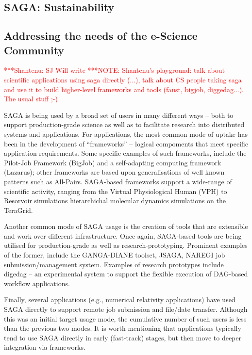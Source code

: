 \documentclass[a4paper,10pt]{article}
\newcommand{\note}[1]{ {\textcolor{red} { ***NOTE: #1 }}}
\newcommand{\jhanote}[1]{  {\textcolor{red}     { ***Shantenu: #1 }}}
\newcommand{\jhanote}[1]{}
\begin{document}
\subsection*{SAGA: Sustainability}
\vspace{-0.5em}
\subsection*{Addressing the needs of the e-Science Community}
\jhanote{SJ Will write} \note{Shantenu's playground: talk about
  scientific applications using saga directly (...), talk about CS
  people taking saga and use it to build higher-level frameworks and
  tools (faust, bigjob, diggedag...). The usual stuff ;-)}

SAGA is being used by a broad set of users in many different ways --
both to support production-grade science as well as to facilitate
research into distributed systems and applications.  For applications,
the most common mode of uptake has been in the development of
``frameworks'' -- logical compoments that meet specific application
requirements. Some specific examples of such frameworks, include the
Pilot-Job Framework (BigJob) and a self-adapting computing framework
(Lazarus); other frameworks are based upon generalisations of well
known patterns such as All-Pairs. SAGA-based frameworks support a
wide-range of scientific activity, ranging from the Virtual
Physiological Human (VPH) to Resorvoir simulations hierarchichal
molecular dynamics simulations on the TeraGrid.

Another common mode of SAGA usage is the creation of tools that are
extensible and work over different infrastructure. Once again,
SAGA-based tools are being utilised for production-grade as well as
research-prototyping. Prominent examples of the former, include the
GANGA-DIANE toolset, JSAGA, NAREGI job submission/management
system. Examples of research prototypes include digedag -- an
experimental system to support the flexible execution of DAG-based
workflow applications.

Finally, several applications (e.g., numerical relativity
applications) have used SAGA directly to support remote job submission
and file/date transfer. Although this was an initial target usage
mode, the cumulative number of such users is less than the previous
two modes. It is worth mentioning that applications typically tend to
use SAGA directly in early (fast-track) stages, but then move to
deeper integration via frameworks.
\vspace{-0.8em}
\pagebreak
\end{document}

